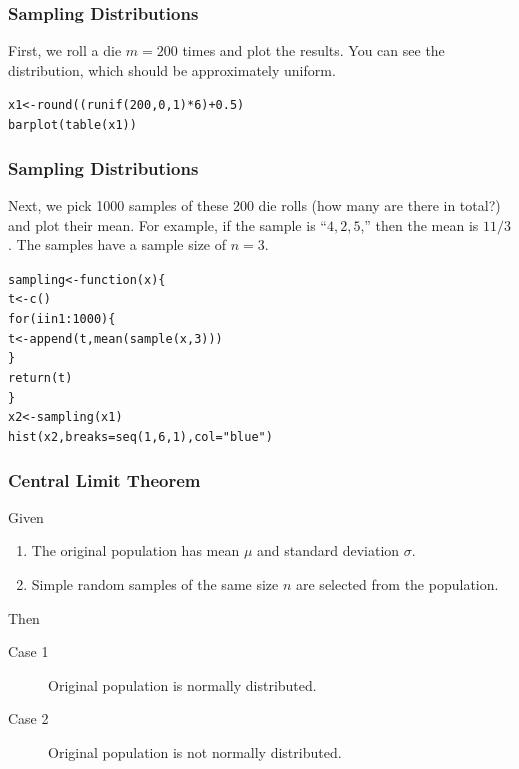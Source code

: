 \documentclass[xcolor=dvipsnames]{beamer}
\begin{document}
\begin{frame}
  \frametitle{Sampling Distributions}
   First, we roll a die $m=200$ times and plot
  the results. You can see the distribution, which should be
  approximately uniform.
\begin{alltt}
x1<-round((runif(200,0,1)*6)+0.5)\newline
barplot(table(x1))
\end{alltt}
\end{frame}

\begin{frame}
  \frametitle{Sampling Distributions}
  Next, we pick 1000 samples of these 200 die rolls (how many are
  there in total?) and plot their mean. For example, if the sample is
  ``$4,2,5$,'' then the mean is $11/3$. The samples have a sample size
  of $n=3$.
\begin{alltt}
sampling<-function(x) \{\newline
t<-c()\newline
for (i in 1:1000) \{\newline
t<-append(t,mean(sample(x,3)))\newline
\}\newline
return(t)\newline
\}\newline
x2<-sampling(x1)\newline
hist(x2,breaks=seq(1,6,1),col="blue")
\end{alltt}
\end{frame}

\begin{frame}
  \frametitle{Central Limit Theorem}
Given
\begin{enumerate}
\item The original population has mean $\mu$ and standard deviation
  $\sigma$.
\item Simple random samples of the same size $n$ are selected from the population.
\end{enumerate}
Then
\begin{description}
\item[Case 1] Original population is \alert{normally distributed}.
\item[Case 2] Original population is \alert{not normally distributed}.
\end{description}
\end{frame}
\end{document}

